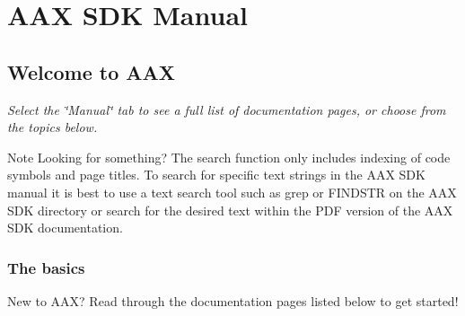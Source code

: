 \hypertarget{a00793}{}\section{A\+AX S\+DK Manual}
\label{a00793}


\subsection{ }
\hypertarget{a00793_welcome}{}\subsection{Welcome to A\+AX}\label{a00793_welcome}
{\itshape Select the \char`\"{}\+Manual\char`\"{} tab to see a full list of documentation pages, or choose from the topics below.}

\begin{DoxyNote}{Note}
Looking for something? The search function only includes indexing of code symbols and page titles. To search for specific text strings in the A\+AX S\+DK manual it is best to use a text search tool such as grep or F\+I\+N\+D\+S\+TR on the A\+AX S\+DK directory or search for the desired text within the P\+DF version of the A\+AX S\+DK documentation.
\end{DoxyNote}
\hypertarget{a00793_welcome_basics}{}\subsubsection{The basics}\label{a00793_welcome_basics}
New to A\+AX? Read through the documentation pages listed below to get started!

